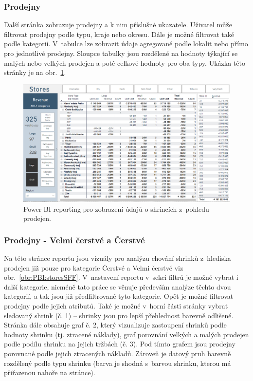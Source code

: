 \subsubsection*{Prodejny}

Další stránka zobrazuje prodejny a k nim příslušné ukazatele. Uživatel může filtrovat prodejny podle typu, kraje nebo okresu. Dále je možné filtrovat také podle kategorií. V~tabulce lze zobrazit údaje agregovaně podle lokalit nebo přímo pro jednotlivé prodejny. Sloupce tabulky jsou rozdělené na hodnoty týkající se malých nebo velkých prodejen a poté celkové hodnoty pro oba typy. Ukázka této stránky je na obr.~\ref*{obr:PBI:stores}.

\begin{figure}[h!]
    \centering
    \captionsetup{justification=centering}
    \includegraphics[width=\textwidth]{obrazky/PBI/stores.png}
    \caption{Power BI reporting pro zobrazení údajů o shrincích z~pohledu prodejen.}
    \label{obr:PBI:stores}
\end{figure}

\subsubsection*{Prodejny - Velmi čerstvé a Čerstvé}

Na této stránce reportu jsou vizuály pro analýzu chování shrinků z~hlediska prodejen již pouze pro kategorie Čerstvé a Velmi čerstvé viz obr.~\ref*{obr:PBI:storesSFF}. V~nastavení reportu v~sekci filtrů je možné vybrat i další kategorie, nicméně tato práce se věnuje především analýze těchto dvou kategorií, a tak jsou již předfiltrované tyto kategorie. Opět je možné filtrovat prodejny podle jejich atributů. Také je možné v~horní části stránky vybrat sledovaný shrink (č. 1) -- shrinky jsou pro lepší přehlednost barevně odlišené. 
Stránka dále obsahuje graf č. 2, který vizualizuje zastoupení shrinků podle hodnoty shrinku (tj. ztracené náklady), graf porovnání velkých a malých prodejen podle podílu shrinku na jejich tržbách (č. 3). Pod tímto grafem jsou prodejny porovnané podle jejich ztracených nákladů. Zároveň je datový pruh barevně rozdělený podle typu shrinku (barva je shodná s~barvou shrinku, kterou má přiřazenou nahoře na stránce). 

